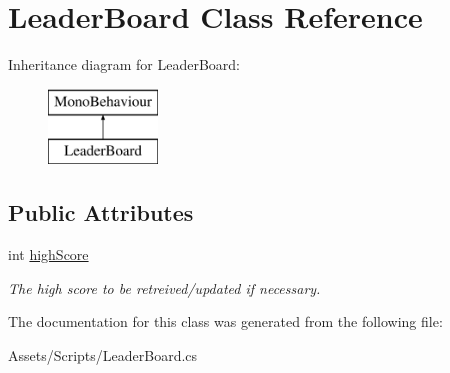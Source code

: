 \hypertarget{class_leader_board}{}\section{Leader\+Board Class Reference}
\label{class_leader_board}
Inheritance diagram for Leader\+Board\+:\begin{figure}[H]
\begin{center}
\leavevmode
\includegraphics[height=2.000000cm]{class_leader_board}
\end{center}
\end{figure}
\subsection*{Public Attributes}
\begin{DoxyCompactItemize}
\item 
\mbox{\label{class_leader_board_a20ea9d21b8e7f2c9138f69f1b074d8a0}} 
int \mbox{\hyperlink{class_leader_board_a20ea9d21b8e7f2c9138f69f1b074d8a0}{high\+Score}}
\begin{DoxyCompactList}\small\item\em The high score to be retreived/updated if necessary. \end{DoxyCompactList}\end{DoxyCompactItemize}


The documentation for this class was generated from the following file\+:\begin{DoxyCompactItemize}
\item 
Assets/\+Scripts/Leader\+Board.\+cs\end{DoxyCompactItemize}
